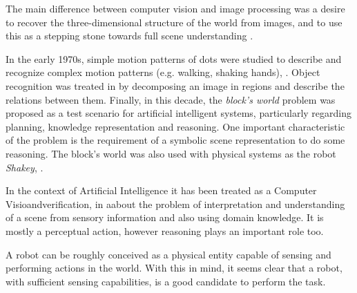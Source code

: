 \documentclass[a4paper, 12pt, openany, oneside]{book}
\begin{document}
The main difference between computer vision and image processing was a desire to recover the three-dimensional structure of the world from images, and to use this as a stepping stone towards full scene understanding \citep{Winston1975_PsyCV}. 


In the early 1970s, simple motion patterns of dots were studied to describe and recognize complex motion patterns (e.g. walking, shaking hands), \citep{Johansson1973_VisualPer}. 
Object recognition was treated in \citep{Barrow1971_RelatDesc} by decomposing an image in regions and describe the relations between them. 
Finally, in this decade, the \textit{block's world} problem was proposed as a test scenario for artificial intelligent systems, particularly regarding planning, knowledge representation and reasoning. 
One important characteristic of the problem is the requirement of a symbolic scene representation to do some reasoning. 
The block's world was also used with physical systems as the robot \textit{Shakey}, \citep{Nilsson84_Shakey}.





In the context of Artificial Intelligence it has been treated as a Computer Visioandverification, in aabout the problem of interpretation and understanding of a scene from sensory information and also using domain knowledge. 
It is mostly a perceptual action, however reasoning plays an important role too.





A robot can be roughly conceived as a physical entity capable of sensing and performing actions in the world.
With this in mind, it seems clear that a robot, with sufficient sensing capabilities, is a good candidate to perform the task.




% 





\clearpage


%
\end{document}
